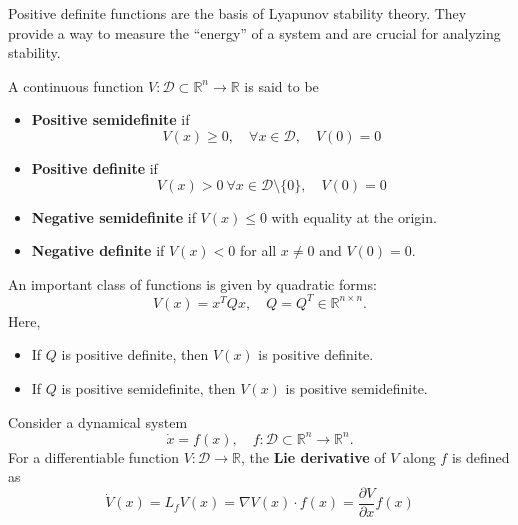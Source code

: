 Positive definite functions are the basis of Lyapunov stability theory.  
They provide a way to measure the ``energy'' of a system and are crucial for analyzing stability.

\begin{definition}
A continuous function $V:\mathcal{D}\subset\mathbb{R}^n \to \mathbb{R}$ is said to be
\begin{itemize}
    \item \textbf{Positive semidefinite} if 
    \[
        V(x) \geq 0, \quad \forall x \in \mathcal{D}, \quad V(0) = 0
    \]
    \item \textbf{Positive definite} if 
    \[
        V(x) > 0 \ \forall x \in \mathcal{D}\setminus\{0\}, \quad V(0)=0
    \]
    \item \textbf{Negative semidefinite} if $V(x) \leq 0$ with equality at the origin.
    \item \textbf{Negative definite} if $V(x) < 0$ for all $x \neq 0$ and $V(0)=0$.
\end{itemize}
\end{definition}

\begin{example}
An important class of functions is given by quadratic forms:
\[
    V(x) = x^T Q x, \quad Q = Q^T \in \mathbb{R}^{n\times n}.
\]
Here,
\begin{itemize}
    \item If $Q$ is positive definite, then $V(x)$ is positive definite.
    \item If $Q$ is positive semidefinite, then $V(x)$ is positive semidefinite.
\end{itemize}
\end{example}

\begin{definition}
Consider a dynamical system 
\[
    \dot{x} = f(x), \quad f:\mathcal{D}\subset\mathbb{R}^n \to \mathbb{R}^n.
\]
For a differentiable function $V:\mathcal{D}\to \mathbb{R}$, the \textbf{Lie derivative} of $V$ along $f$ is defined as
\[
    \dot{V}(x) = L_f V(x) = \nabla V(x)\cdot f(x) =\frac{\partial V}{\partial x}f(x)
\]
\end{definition}

